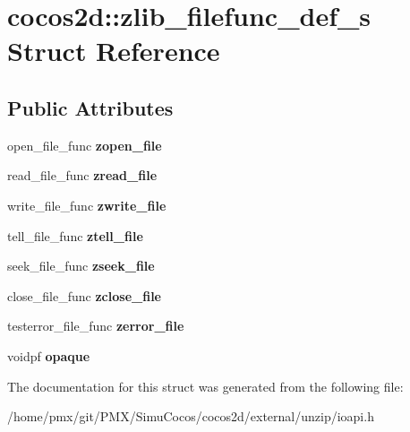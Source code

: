 \hypertarget{structcocos2d_1_1zlib__filefunc__def__s}{}\section{cocos2d\+:\+:zlib\+\_\+filefunc\+\_\+def\+\_\+s Struct Reference}
\label{structcocos2d_1_1zlib__filefunc__def__s}
\subsection*{Public Attributes}
\begin{DoxyCompactItemize}
\item 
\mbox{\label{structcocos2d_1_1zlib__filefunc__def__s_a437ce0765b06d872befee28e32eedd32}} 
open\+\_\+file\+\_\+func {\bfseries zopen\+\_\+file}
\item 
\mbox{\label{structcocos2d_1_1zlib__filefunc__def__s_a8b38d475ad99c4573513a49b5910f5c3}} 
read\+\_\+file\+\_\+func {\bfseries zread\+\_\+file}
\item 
\mbox{\label{structcocos2d_1_1zlib__filefunc__def__s_afc0fe38838f1e695c9caa4bcae5f925d}} 
write\+\_\+file\+\_\+func {\bfseries zwrite\+\_\+file}
\item 
\mbox{\label{structcocos2d_1_1zlib__filefunc__def__s_a7147adf7bc7bfc3dadaaee132e96d035}} 
tell\+\_\+file\+\_\+func {\bfseries ztell\+\_\+file}
\item 
\mbox{\label{structcocos2d_1_1zlib__filefunc__def__s_ae1eba641eace99416417918b64ef649e}} 
seek\+\_\+file\+\_\+func {\bfseries zseek\+\_\+file}
\item 
\mbox{\label{structcocos2d_1_1zlib__filefunc__def__s_a516d8ca8e6036cf6327050acea8566a5}} 
close\+\_\+file\+\_\+func {\bfseries zclose\+\_\+file}
\item 
\mbox{\label{structcocos2d_1_1zlib__filefunc__def__s_a64d800620dbb079e97e15cb00a62df1e}} 
testerror\+\_\+file\+\_\+func {\bfseries zerror\+\_\+file}
\item 
\mbox{\label{structcocos2d_1_1zlib__filefunc__def__s_a4712b862cbc5e2c4d2301679b5d24952}} 
voidpf {\bfseries opaque}
\end{DoxyCompactItemize}


The documentation for this struct was generated from the following file\+:\begin{DoxyCompactItemize}
\item 
/home/pmx/git/\+P\+M\+X/\+Simu\+Cocos/cocos2d/external/unzip/ioapi.\+h\end{DoxyCompactItemize}
